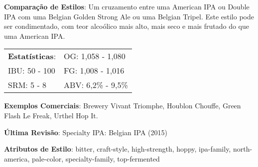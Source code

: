 \textbf{Comparação de Estilos}: Um cruzamento entre uma American IPA ou Double IPA com uma Belgian Golden Strong Ale ou uma Belgian Tripel. Este estilo pode ser condimentado, com teor alcoólico mais alto, mais seco e mais frutado do que uma American IPA.

\begin{tabular}{@{}p{35mm}p{35mm}@{}}
  \textbf{Estatísticas}: & OG: 1,058 - 1,080 \\
  IBU: 50 - 100 & FG: 1,008 - 1,016 \\
  SRM: 5 - 8  & ABV: 6,2\% - 9,5\%
\end{tabular}

\textbf{Exemplos Comerciais}: Brewery Vivant Triomphe, Houblon Chouffe, Green Flash Le Freak, Urthel Hop It.

\textbf{Última Revisão}: Specialty IPA: Belgian IPA (2015)

\textbf{Atributos de Estilo}: bitter, craft-style, high-strength, hoppy, ipa-family, north-america, pale-color, specialty-family, top-fermented
